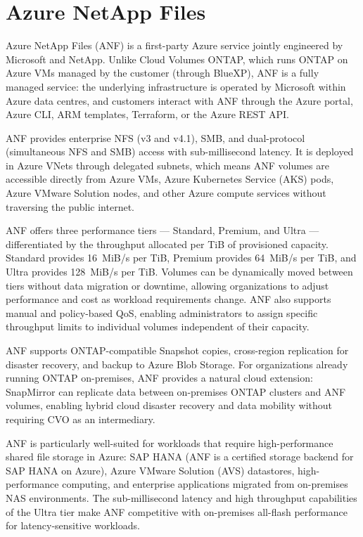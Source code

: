 \section{Azure NetApp Files}

Azure NetApp Files (ANF) is a first-party Azure service jointly engineered by
Microsoft and NetApp. Unlike Cloud Volumes ONTAP, which runs ONTAP on Azure
VMs managed by the customer (through BlueXP), ANF is a fully managed service:
the underlying infrastructure is operated by Microsoft within Azure data
centres, and customers interact with ANF through the Azure portal, Azure CLI,
ARM templates, Terraform, or the Azure REST API.

ANF provides enterprise NFS (v3 and v4.1), SMB, and dual-protocol
(simultaneous NFS and SMB) access with sub-millisecond latency. It is deployed
in Azure VNets through delegated subnets, which means ANF volumes are
accessible directly from Azure VMs, Azure Kubernetes Service (AKS) pods,
Azure VMware Solution nodes, and other Azure compute services without
traversing the public internet.

ANF offers three performance tiers --- Standard, Premium, and Ultra ---
differentiated by the throughput allocated per TiB of provisioned capacity.
Standard provides 16~MiB/s per TiB, Premium provides 64~MiB/s per TiB, and
Ultra provides 128~MiB/s per TiB. Volumes can be dynamically moved between
tiers without data migration or downtime, allowing organizations to adjust
performance and cost as workload requirements change. ANF also supports manual
and policy-based QoS, enabling administrators to assign specific throughput
limits to individual volumes independent of their capacity.

ANF supports ONTAP-compatible Snapshot copies, cross-region replication for
disaster recovery, and backup to Azure Blob Storage. For organizations already
running ONTAP on-premises, ANF provides a natural cloud extension: SnapMirror
can replicate data between on-premises ONTAP clusters and ANF volumes,
enabling hybrid cloud disaster recovery and data mobility without requiring
CVO as an intermediary.

ANF is particularly well-suited for workloads that require high-performance
shared file storage in Azure: SAP HANA (ANF is a certified storage backend
for SAP HANA on Azure), Azure VMware Solution (AVS) datastores,
high-performance computing, and enterprise applications migrated from
on-premises NAS environments. The sub-millisecond latency and high throughput
capabilities of the Ultra tier make ANF competitive with on-premises all-flash
performance for latency-sensitive workloads.

